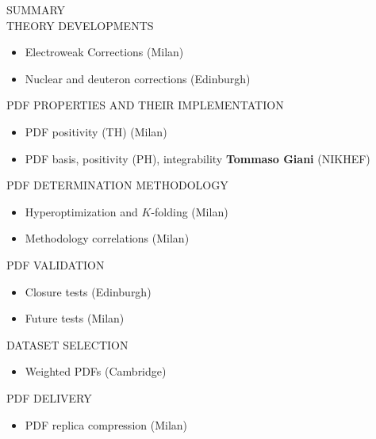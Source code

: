 \documentclass[a4,landscape]{seminar}
\newcommand{\1}{1\!\!\!1}
\begin{document}
\begin{slide}{\small
\begin{center}{\large\darkgreen SUMMARY}\\
{\blue THEORY DEVELOPMENTS}
\end{center}
\begin{itemize}
\item  Electroweak Corrections    (Milan)
\item Nuclear and deuteron corrections  (Edinburgh)
\end{itemize}
\begin{center}
{\blue PDF PROPERTIES AND THEIR IMPLEMENTATION}
\end{center}
\begin{itemize}
\item PDF positivity (TH)  (Milan)
\item PDF basis, positivity (PH), integrability  \qquad
  {\bf Tommaso Giani} (NIKHEF)
\end{itemize}
\begin{center}
{\blue  PDF DETERMINATION METHODOLOGY}
\end{center}
\begin{itemize}
\item Hyperoptimization and $K$-folding  (Milan)    
\item Methodology correlations  (Milan)
\end{itemize}
\begin{center}
{\blue  PDF VALIDATION}
\end{center}
\begin{itemize}
\item Closure tests (Edinburgh)
\item Future tests  (Milan)    
\end{itemize}
\begin{center}
{\blue  DATASET SELECTION}
\end{center}
\begin{itemize}
\item Weighted PDFs (Cambridge)
\end{itemize}
\begin{center}
{\blue  PDF DELIVERY}
\end{center}
\begin{itemize}
\item PDF replica compression (Milan)
\end{itemize}


  }


\end{slide}
\end{document}

